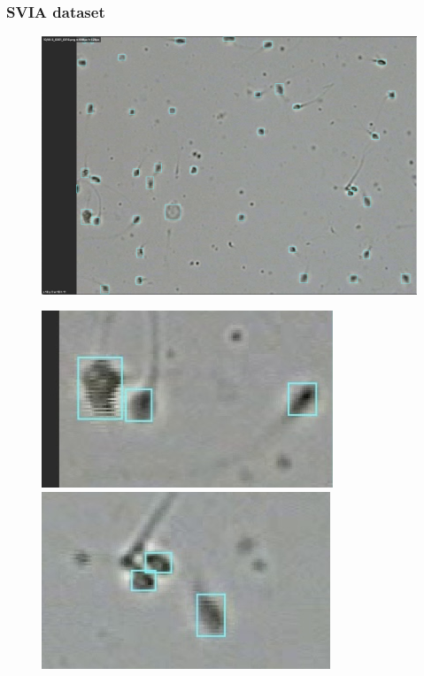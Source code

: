 \documentclass[aspectratio=169]{beamer}
\begin{document}
\begin{frame}
    \frametitle{SVIA dataset}

    \begin{figure}
        \centering
        \begin{adjustbox}{max width=0.8\textwidth}
            \begin{minipage}{0.6\textwidth}
                \includegraphics[width=\linewidth]{img/svia-1.jpg} %
            \end{minipage}%
            \begin{minipage}{0.4\textwidth}
                \includegraphics[width=\linewidth]{img/svia-2.jpg}\\ %
                \includegraphics[width=\linewidth]{img/svia-3.jpg}  %

\end{minipage}
\end{adjustbox}
\end{figure}
\end{frame}
\end{document}
